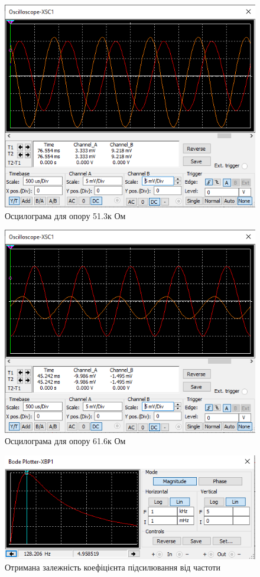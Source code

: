 \documentclass{article}
\begin{document}
\begin{normalsize}
	\begin{figure}[H]
		\centering
		\includegraphics[width=\textwidth]{12}
		\caption{Осцилограма для опору 51.3к Ом}
	\end{figure}
	
	\begin{figure}[H]
		\centering
		\includegraphics[width=\textwidth]{13}
		\caption{Осцилограма для опору 61.6к Ом}
	\end{figure}
	
	\begin{figure}[H]
		\centering
		\includegraphics[width=\textwidth]{14}
		\caption{Отримана залежність коефіцієнта підсилювання від частоти}
	\end{figure}
	

\end{normalsize}
\end{document}
